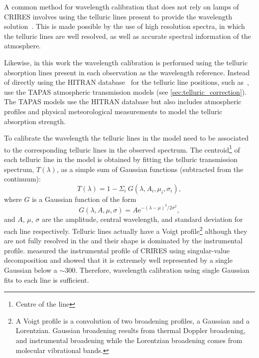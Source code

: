 A common method for wavelength calibration that does not rely on \thar{} lamps of {CRIRES} involves using the telluric lines present to provide the wavelength solution~\citep[e.g.][]{brogi_signature_2012,brogi_carbon_2014,dekok_detection_2013,piskorz_evidence_2016}.
This is made possible by the use of high resolution spectra, in which the telluric lines are well resolved, as well as accurate spectral information of the atmosphere.

Likewise, in this work the wavelength calibration is performed using the telluric absorption lines present in each observation as the wavelength reference.
Instead of directly using the {HITRAN} database~\citep{rothman_hitran2012_2013} for the telluric line positions, such as~\citet[][]{brogi_signature_2012, brogi_carbon_2014, dekok_detection_2013}, use the {TAPAS} atmospheric transmission models (see \cref{sec:telluric_correction}).
The {TAPAS} models use the {HITRAN} database but also includes atmospheric profiles and physical meteorological measurements to model the telluric absorption strength.

To calibrate the wavelength the telluric lines in the model need to be associated to the corresponding telluric lines in the observed spectrum.
The centroid\footnote{Centre of the line} of each telluric line in the model is obtained by fitting the telluric transmission spectrum, \(T(\lambda)\), as a simple sum of Gaussian functions (subtracted from the continuum):
\begin{equation}
T(\lambda) = 1 - {\Sigma}_{i}\ G(\lambda, A_{i}, {\mu}_{i}, {\sigma}_{i}),
\end{equation}
where \(G\) is a Gaussian function of the form
\begin{equation}
G(\lambda, A, \mu, \sigma) = {A \textrm{e}}^{{-(\lambda-\mu)}^{2}/2\sigma^{2}},
\end{equation}
and \(A\), \(\mu\), \(\sigma\) are the amplitude, central wavelength, and standard deviation for each line respectively.
Telluric lines actually have a Voigt profile\footnote{A Voigt profile is a convolution of two broadening profiles, a Gaussian and a Lorentzian.
Gaussian broadening results from thermal Doppler broadening, and instrumental broadening while the Lorentzian broadening comes from molecular vibrational bands\citep{meier_art_2005}.} although they are not fully resolved in the \nir{} and their shape is dominated by the instrumental profile.
\citet{seifahrt_synthesising_2010} measured the instrumental profile of {CRIRES} using singular-value decomposition and showed that it is extremely well represented by a single Gaussian below a \snr{}$\sim$300.
Therefore, wavelength calibration using single Gaussian fits to each line is sufficient.


